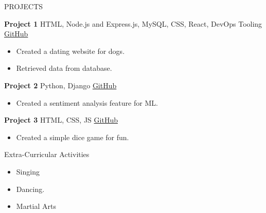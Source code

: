 \documentclass{resume} %
\begin{document}
\begin{rSection}{PROJECTS}
\vspace{-1.25em}
\item \textbf{Project 1} {HTML, Node.js and Express.js, MySQL, CSS, React, DevOps Tooling} \hfill \href{https://github.com/Mrityu503/tindog}{GitHub}
\begin{itemize}
    \itemsep -3pt {} 
     \item Created a dating website for dogs.
     \item Retrieved data from database.
 \end{itemize}
\item \textbf{Project 2} {Python, Django} \hfill \href{https://github.com/Mrityu503/twitter-sentiment-training}{GitHub}
\begin{itemize}
    \itemsep -3pt {} 
     \item Created a sentiment analysis feature for ML.
 \end{itemize}
\item \textbf{Project 3} {HTML, CSS, JS} \hfill \href{https://github.com/Mrityu503/dice-game}{GitHub}
\begin{itemize}
    \itemsep -3pt {} 
     \item Created a simple dice game for fun.
 \end{itemize}
\end{rSection} 

\begin{rSection}{Extra-Curricular Activities} 
\begin{itemize}
    \item 	Singing
    \item	Dancing.
    \item   Martial Arts
\end{itemize}


\end{rSection}
\end{document}
